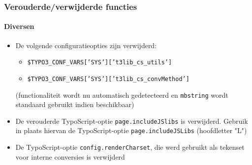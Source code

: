 \begin{frame}[fragile]
	\frametitle{Verouderde/verwijderde functies}
	\framesubtitle{Diversen}

	\begin{itemize}

		\item De volgende configuratieopties zijn verwijderd:

			\begin{itemize}
				\item \texttt{\$TYPO3\_CONF\_VARS['SYS']['t3lib\_cs\_utils']}
				\item \texttt{\$TYPO3\_CONF\_VARS['SYS']['t3lib\_cs\_convMethod']}
			\end{itemize}

			\small
				(functionaliteit wordt nu automatisch gedetecteerd en \texttt{mbstring} wordt
				standaard gebruikt indien beschikbaar)
			\normalsize

		\item De verouderde TypoScript-optie \texttt{page.includeJSlibs} is
			verwijderd. Gebruik in plaats hiervan de TypoScript-optie \texttt{page.includeJSLibs}
			(hoofdletter "L") 

		\item De TypoScript-optie \texttt{config.renderCharset}, die werd gebruikt
			als tekenset voor interne conversies is verwijderd

	\end{itemize}

\end{frame}

